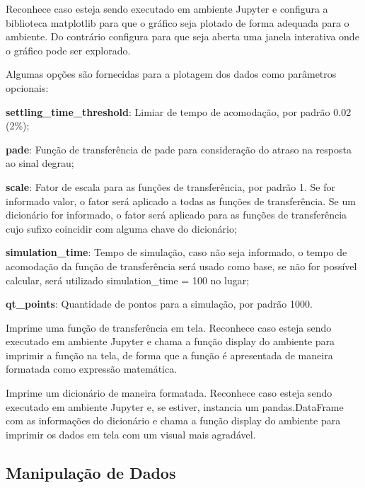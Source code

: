 Reconhece caso esteja sendo executado em ambiente Jupyter e configura a biblioteca matplotlib para que o gráfico
seja plotado de forma adequada para o ambiente.
Do contrário configura para que seja aberta uma janela interativa onde o gráfico pode ser explorado.

Algumas opções são fornecidas para a plotagem dos dados como parâmetros opcionais:
\begin{alineas}
    \item \textbf{settling\_time\_threshold}: Limiar de tempo de acomodação, por padrão 0.02 (2\%);
    \item \textbf{pade}: Função de transferência de pade para consideração do atraso na resposta ao sinal degrau;

    \item \textbf{scale}: Fator de escala para as funções de transferência, por padrão 1.
    Se for informado valor, o fator será aplicado a todas as funções de transferência.
    Se um dicionário for informado, o fator será aplicado para as funções de transferência cujo sufixo coincidir com
    alguma chave do dicionário;

    \item \textbf{simulation\_time}: Tempo de simulação, caso não seja informado, o tempo de acomodação da função de
    transferência será usado como base, se não for possível calcular, será utilizado simulation\_time = 100 no lugar;

    \item \textbf{qt\_points}: Quantidade de pontos para a simulação, por padrão 1000.
\end{alineas}

Imprime uma função de transferência em tela.
Reconhece caso esteja sendo executado em ambiente Jupyter e chama a função display do ambiente para imprimir a função
na tela, de forma que a função é apresentada de maneira formatada como expressão matemática.

Imprime um dicionário de maneira formatada.
Reconhece caso esteja sendo executado em ambiente Jupyter e, se estiver, instancia um pandas.DataFrame com as
informações do dicionário e chama a função display do ambiente para imprimir os dados em tela com um visual mais
agradável.

\subsection{Manipulação de Dados}

